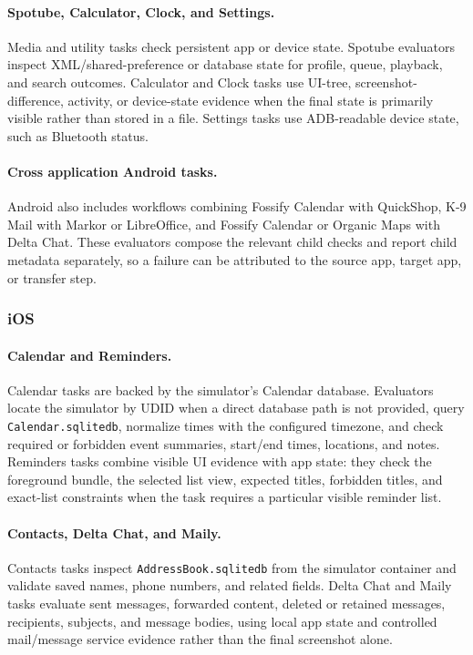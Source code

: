 \paragraph{Spotube, Calculator, Clock, and Settings.}
Media and utility tasks check persistent app or device state. Spotube evaluators inspect XML/shared-preference or database state for profile, queue, playback, and search outcomes. Calculator and Clock tasks use UI-tree, screenshot-difference, activity, or device-state evidence when the final state is primarily visible rather than stored in a file. Settings tasks use ADB-readable device state, such as Bluetooth status.

\paragraph{Cross application Android tasks.}
Android also includes workflows combining Fossify Calendar with QuickShop, K-9 Mail with Markor or LibreOffice, and Fossify Calendar or Organic Maps with Delta Chat. These evaluators compose the relevant child checks and report child metadata separately, so a failure can be attributed to the source app, target app, or transfer step.

\subsubsection{iOS}
\paragraph{Calendar and Reminders.}
Calendar tasks are backed by the simulator's Calendar database. Evaluators locate the simulator by UDID when a direct database path is not provided, query \texttt{Calendar.sqlitedb}, normalize times with the configured timezone, and check required or forbidden event summaries, start/end times, locations, and notes. Reminders tasks combine visible UI evidence with app state: they check the foreground bundle, the selected list view, expected titles, forbidden titles, and exact-list constraints when the task requires a particular visible reminder list.

\paragraph{Contacts, Delta Chat, and Maily.}
Contacts tasks inspect \texttt{AddressBook.sqlitedb} from the simulator container and validate saved names, phone numbers, and related fields. Delta Chat and Maily tasks evaluate sent messages, forwarded content, deleted or retained messages, recipients, subjects, and message bodies, using local app state and controlled mail/message service evidence rather than the final screenshot alone.

